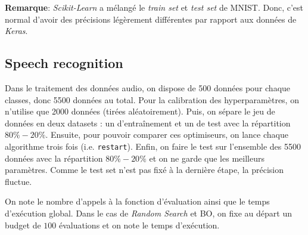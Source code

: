 \documentclass[12 pt, a4paper]{article}
\begin{document}
\textbf{Remarque}: \textit{Scikit-Learn} a mélangé le \emph{train set} et \emph{test set} de MNIST. Donc, c'est normal d'avoir des précisions légèrement différentes par rapport aux données de \textit{Keras}.

\subsection*{Speech recognition}




Dans le traitement des données audio, on dispose de 500 données pour chaque classes, donc 5500 données au total. Pour la calibration des hyperparamètres, on n'utilise que 2000 données (tirées aléatoirement). Puis, on sépare le jeu de données en deux datasets : un d'entraînement et un de test avec la répartition $80\%-20\%$. Ensuite, pour pouvoir comparer ces optimiseurs, on lance chaque algorithme trois fois (i.e. \texttt{restart}). Enfin, on faire le test sur l'ensemble des 5500 données avec la répartition $80\%-20\%$ et on ne garde que les meilleurs paramètres. Comme le test set n'est pas fixé à la dernière étape, la précision fluctue.

On note le nombre d'appels à la fonction d'évaluation ainsi que le temps d'exécution global. Dans le cas de \textit{Random Search} et BO, on fixe au départ un budget de $100$ évaluations et on note le temps d'exécution.
\end{document}
